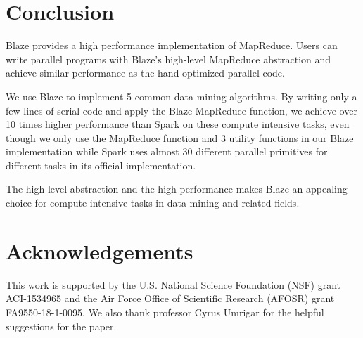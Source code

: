\section{Conclusion}
\label{sec:con}
Blaze provides a high performance implementation of MapReduce.
Users can write parallel programs with Blaze's high-level MapReduce abstraction and achieve similar performance as the hand-optimized parallel code.

We use Blaze to implement 5 common data mining algorithms.
By writing only a few lines of serial code and apply the Blaze MapReduce function, we achieve over 10 times higher performance than Spark on these compute intensive tasks, even though we only use the MapReduce function and 3 utility functions in our Blaze implementation while Spark uses almost 30 different parallel primitives for different tasks in its official implementation.

The high-level abstraction and the high performance makes Blaze an appealing choice for compute intensive tasks in data mining and related fields.


\section{Acknowledgements}
This work is supported by the U.S. National Science Foundation (NSF) grant ACI-1534965 and the Air Force Office of Scientific Research (AFOSR) grant FA9550-18-1-0095.
We also thank professor Cyrus Umrigar for the helpful suggestions for the paper.


